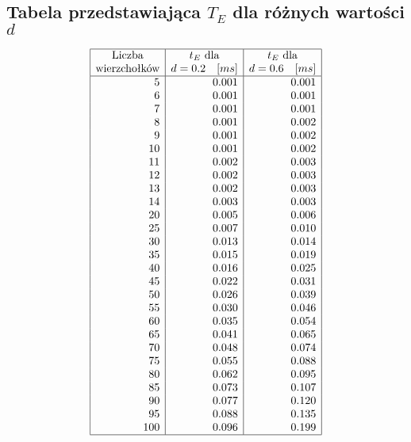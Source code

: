 \documentclass[polish,polish,a4paper]{article}
\begin{document}
\begin{spacing}{1.25}
\begin{spacing}{1.3}
{		\subsection*{Tabela przedstawiająca $T_{E}$ dla różnych wartości $d$ }
	}
	\begin{equation*}
	\begin{array}{|r|r|r|}
	\hline
	\multicolumn{1}{|c|}{$Liczba$}&
	\multicolumn{1}{c|}{t_{E} $ dla$}&
	\multicolumn{1}{c|}{t_{E} $ dla$}\\
	\multicolumn{1}{|c|}{$wierzchołków$}&
	\multicolumn{1}{c|}{d = 0.2 \quad [ms]}&
	\multicolumn{1}{c|}{d= 0.6\quad [ms]}\\
	\hline
	5&0.001&0.001\\
	6&0.001&0.001\\
	7&0.001&0.001\\
	8&0.001&0.002\\
	9&0.001&0.002\\
	10&0.001&0.002\\
	11&0.002&0.003\\
	12&0.002&0.003\\
	13&0.002&0.003\\
	14&0.003&0.003\\
	20&0.005&0.006\\
	25&0.007&0.010\\
	30&0.013&0.014\\
	35&0.015&0.019\\
	40&0.016&0.025\\
	45&0.022&0.031\\
	50&0.026&0.039\\
	55&0.030&0.046\\
	60&0.035&0.054\\
	65&0.041&0.065\\
	70&0.048&0.074\\
	75&0.055&0.088\\
	80&0.062&0.095\\
	85&0.073&0.107\\
	90&0.077&0.120\\
	95&0.088&0.135\\
	100&0.096&0.199\\\hline
	\end{array}
	\end{equation*}
\end{spacing}


\begin{figure}[H]
		\centering

\end{figure}
\end{spacing}
\end{document}
